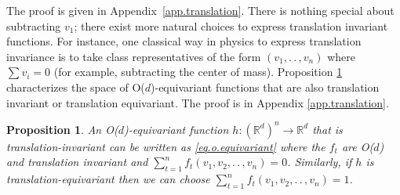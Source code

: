 \documentclass{article}
\makeatletter
\theoremstyle{Hogg}
\newtheorem{proposition}[theorem]{Proposition}
\renewenvironment{proof}[1][\proofname]{\par
  \vspace{-\topsep}%
  \pushQED{\qed}%
  \normalfont
  \topsep0pt \partopsep0pt %
  \trivlist
  \item[\hskip\labelsep
        \itshape
    #1\@addpunct{.}]\ignorespaces
}{%
  \popQED\endtrivlist\@endpefalse
  \addvspace{0pt plus 0pt} %
}
\renewcommand{\ldots}{.\,.\,}
\renewcommand{\cdots}{\ldots}
\makeatother
\begin{document}
The proof is given in Appendix~\ref{app.translation}. There is nothing special about subtracting $v_1$; there exist more natural choices to express translation invariant functions. For instance, one classical way in physics to express translation invariance is to take class representatives of the form $(v_1, \ldots, v_n)$ where $\sum v_i =0$ (for example, subtracting the center of mass). Proposition \ref{prop.Ed} characterizes the space of O($d$)-equivariant functions that are also translation invariant or translation equivariant. The proof is in Appendix \ref{app.translation}. 

\begin{proposition} \label{prop.Ed}
An O($d$)-equivariant function $h:(\mathbb R^d)^n\to \mathbb R^d$ that is translation-invariant can be written as \eqref{eq.o.equivariant} where the $f_t$ are O($d$) and translation invariant and $\sum_{t=1}^nf_t(v_1, v_2, \cdots, v_n)=0$. Similarly, if $h$ is translation-equivariant then we can choose $\sum_{t=1}^nf_t(v_1, v_2, \cdots, v_n)=1$.
\end{proposition}

\end{document}
